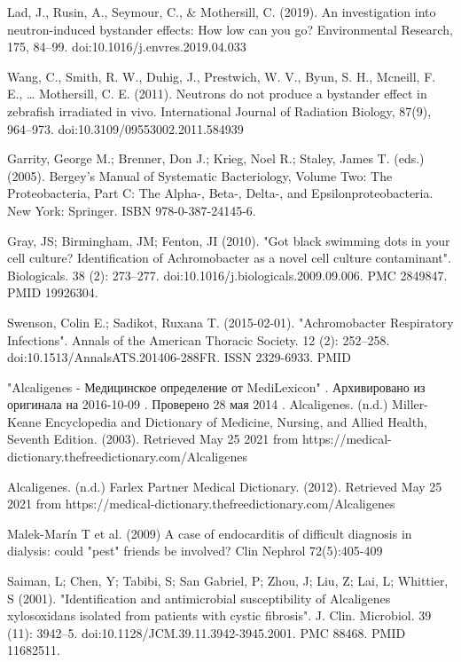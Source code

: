 \documentclass[11pt]{article}
\begin{document}
\begin{thebibliography}{3}
		 Lad, J., Rusin, A., Seymour, C., \& Mothersill, C. (2019). An investigation into neutron-induced bystander effects: How low can you go? Environmental Research, 175, 84–99. doi:10.1016/j.envres.2019.04.033 
		
		 Wang, C., Smith, R. W., Duhig, J., Prestwich, W. V., Byun, S. H., Mcneill, F. E., … Mothersill, C. E. (2011). Neutrons do not produce a bystander effect in zebrafish irradiated in vivo. International Journal of Radiation Biology, 87(9), 964–973. doi:10.3109/09553002.2011.584939
		
		 Garrity, George M.; Brenner, Don J.; Krieg, Noel R.; Staley, James T. (eds.) (2005). Bergey's Manual of Systematic Bacteriology, Volume Two: The Proteobacteria, Part C: The Alpha-, Beta-, Delta-, and Epsilonproteobacteria. New York: Springer. ISBN 978-0-387-24145-6.
		
		 Gray, JS; Birmingham, JM; Fenton, JI (2010). "Got black swimming dots in your cell culture? Identification of Achromobacter as a novel cell culture contaminant". Biologicals. 38 (2): 273–277. doi:10.1016/j.biologicals.2009.09.006. PMC 2849847. PMID 19926304.
		
		 Swenson, Colin E.; Sadikot, Ruxana T. (2015-02-01). "Achromobacter Respiratory Infections". Annals of the American Thoracic Society. 12 (2): 252–258. doi:10.1513/AnnalsATS.201406-288FR. ISSN 2329-6933. PMID 
		
		 "Alcaligenes - Медицинское определение от MediLexicon" . Архивировано из оригинала на 2016-10-09 . Проверено 28 мая 2014 .
		  Alcaligenes. (n.d.) Miller-Keane Encyclopedia and Dictionary of Medicine, Nursing, and Allied Health, Seventh Edition. (2003). Retrieved May 25 2021 from https://medical-dictionary.thefreedictionary.com/Alcaligenes
		
		 Alcaligenes. (n.d.) Farlex Partner Medical Dictionary. (2012). Retrieved May 25 2021 from https://medical-dictionary.thefreedictionary.com/Alcaligenes
		
		  Malek-Marín T et al. (2009) A case of endocarditis of difficult diagnosis in dialysis: could "pest" friends be involved? Clin Nephrol 72(5):405-409
		
		 Saiman, L; Chen, Y; Tabibi, S; San Gabriel, P; Zhou, J; Liu, Z; Lai, L; Whittier, S (2001). "Identification and antimicrobial susceptibility of Alcaligenes xylosoxidans isolated from patients with cystic fibrosis". J. Clin. Microbiol. 39 (11): 3942–5. doi:10.1128/JCM.39.11.3942-3945.2001. PMC 88468. PMID 11682511.
		

\end{thebibliography}
\end{document}
